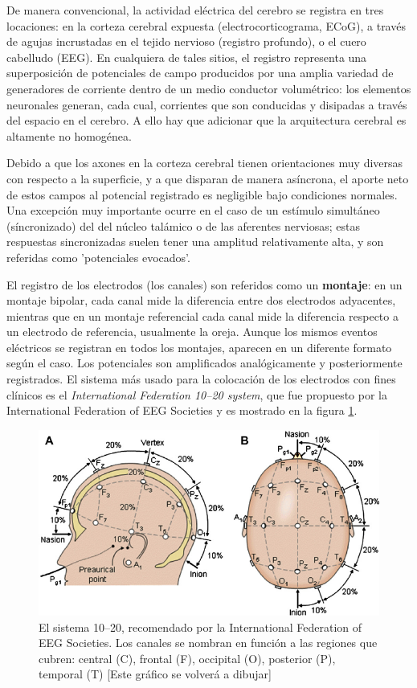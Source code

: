 \documentclass[12pt,a4paper]{mitthesis}
\begin{document}
De manera convencional, la actividad el\'ectrica del cerebro se registra en tres locaciones: en la 
corteza cerebral expuesta (electrocorticograma, ECoG), a trav\'es de agujas incrustadas en el 
tejido nervioso (registro profundo), o el cuero cabelludo (EEG).
En cualquiera de tales sitios, el registro representa una superposici\'on de potenciales de campo 
producidos por una amplia variedad de generadores de corriente dentro de un medio conductor 
volum\'etrico: los elementos neuronales generan, cada cual, corrientes que son conducidas y 
disipadas a trav\'es del espacio en el cerebro.
A ello hay que adicionar que la arquitectura cerebral es altamente no homog\'enea.

Debido a que los axones en la corteza cerebral tienen orientaciones muy diversas con respecto a la 
superficie, y a que disparan de manera as\'incrona, el aporte neto de estos campos al potencial 
registrado es negligible bajo condiciones normales.
Una excepci\'on muy importante ocurre en el caso de un est\'imulo simult\'aneo (s\'incronizado) del 
del n\'ucleo tal\'amico o de las aferentes nerviosas; estas respuestas sincronizadas suelen tener 
una amplitud relativamente alta, y son referidas como 'potenciales evocados'.

El registro de los electrodos (los canales) son referidos como un \textbf{montaje}: en un montaje 
bipolar, cada canal mide la diferencia entre dos electrodos adyacentes, mientras que en un montaje 
referencial cada canal mide la diferencia respecto a un electrodo de referencia, usualmente la 
oreja.
Aunque los mismos eventos el\'ectricos se registran en todos los montajes, aparecen en un diferente 
formato seg\'un el caso. 
Los potenciales son amplificados anal\'ogicamente y posteriormente registrados.
El sistema m\'as usado para la colocaci\'on de los electrodos con fines cl\'inicos es el 
\textit{International Federation 10--20 system}, que fue propuesto por la International Federation 
of EEG Societies \cite{Jasper58,AASM07} y es mostrado en la figura \ref{img1020}. 

\begin{figure}
\centering
\includegraphics[width=0.9\linewidth]{Fig.png} 
\caption{El sistema 10--20, recomendado por la
International Federation of EEG Societies. Los canales se nombran en funci\'on a las regiones
que cubren: central (C), frontal (F), occipital (O), posterior (P), temporal (T) [Este gr\'afico se volver\'a a dibujar]
}
\label{img1020}
\end{figure}
\end{document}
